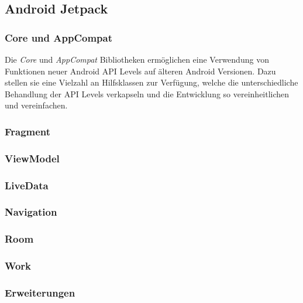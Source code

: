 \documentclass[a4paper, 11pt]{article}
\begin{document}
\subsection{Android Jetpack}
\label{subsec:app:jetpack}

\subsubsection{Core und AppCompat}
\label{subsubsec:app:jetpack:base}

Die \textit{Core} und \textit{AppCompat} Bibliotheken ermöglichen eine Verwendung von Funktionen neuer Android API Levels auf älteren Android Versionen.
Dazu stellen sie eine Vielzahl an Hilfsklassen zur Verfügung, welche die unterschiedliche Behandlung der API Levels verkapseln und die Entwicklung so vereinheitlichen und vereinfachen.

\subsubsection{Fragment}
\label{subsubsec:app:jetpack:fragment}

\subsubsection{ViewModel}
\label{subsubsec:app:jetpack:viewmodel}

\subsubsection{LiveData}
\label{subsubsec:app:jetpack:livedata}

\subsubsection{Navigation}
\label{subsubsec:app:jetpack:navigation}

\subsubsection{Room}
\label{subsubsec:app:jetpack:room}

\subsubsection{Work}
\label{subsubsec:app:jetpack:work}

\subsubsection{Erweiterungen}
\label{subsubsec:app:jetpack:extensions}
\end{document}
